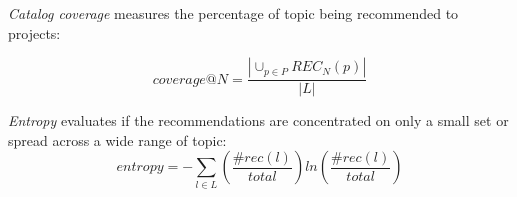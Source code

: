 \emph{Catalog coverage} measures the percentage of topic being recommended to projects:%

\begin{equation}\label{eqn:Coverage}
coverage@N = \frac{\left | \cup_{p\in P} REC_{N}(p) \right | }{\left | L \right |} 
\end{equation}	

\emph{Entropy} evaluates if the recommendations are concentrated on only a small set or spread across a wide range of topic:%
\begin{equation}\label{eqn:Entropy}
entropy = -\sum_{l \in L}\left ( \frac{\#rec(l)}{total} \right )ln \left ( \frac{\#rec(l)}{total} \right )
\end{equation}





